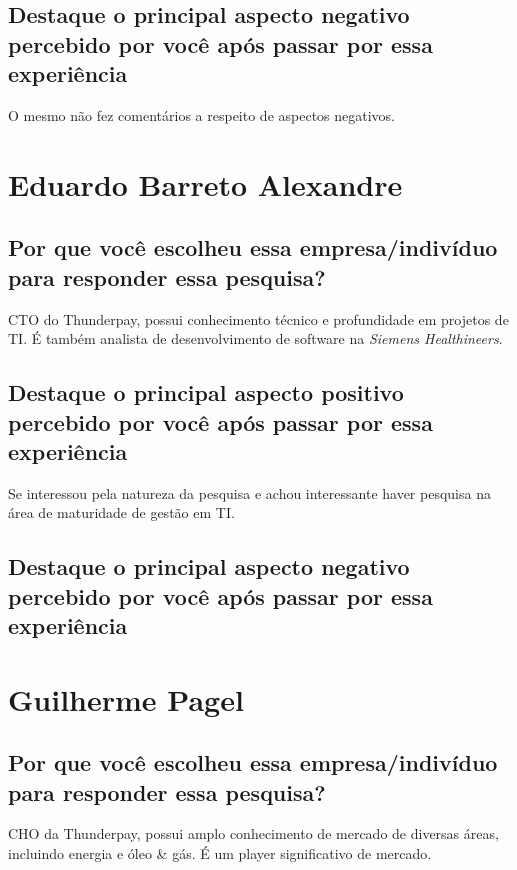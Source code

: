 \subsection{Destaque o principal aspecto negativo percebido por você após passar por essa experiência}

O mesmo não fez comentários a respeito de aspectos negativos.

\section{Eduardo Barreto Alexandre}

\subsection{Por que você escolheu essa empresa/indivíduo para responder essa pesquisa?}

CTO do Thunderpay, possui conhecimento técnico e profundidade em projetos de TI. É também analista de desenvolvimento de software na \emph{Siemens Healthineers}.

\subsection{Destaque o principal aspecto positivo percebido por você após passar por essa experiência}

Se interessou pela natureza da pesquisa e achou interessante haver pesquisa na área de maturidade de gestão em TI.

\subsection{Destaque o principal aspecto negativo percebido por você após passar por essa experiência}

\section{Guilherme Pagel}

\subsection{Por que você escolheu essa empresa/indivíduo para responder essa pesquisa?}

CHO da Thunderpay, possui amplo conhecimento de mercado de diversas áreas, incluindo energia e óleo \& gás. É um player significativo de mercado.

